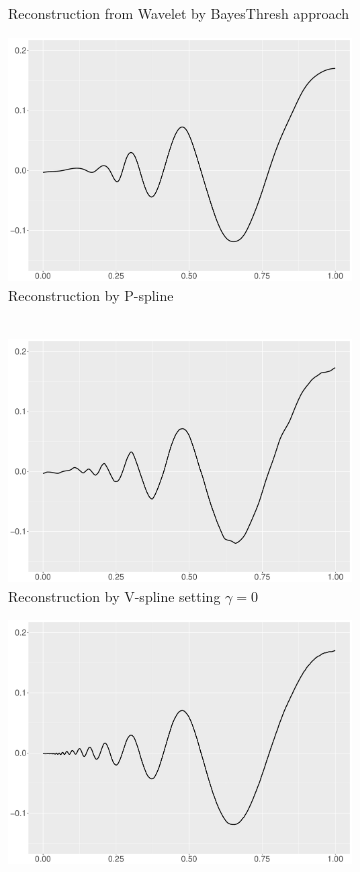 \begin{figure}
\begin{subfigure}{0.45\textwidth}
    \caption{Reconstruction from Wavelet by BayesThresh approach}
    \end{subfigure}
    \begin{subfigure}{0.45\textwidth}
    \centering
    \includegraphics[width=\linewidth,height=0.45\textwidth]{Chapters/02TractorSplineTheory/plot/ggplot/ggDopplerPSpline.pdf}
    \caption{Reconstruction by P-spline \\\mbox{  } }
    \end{subfigure}
    \begin{subfigure}{0.45\textwidth}
    \centering
    \includegraphics[width=\linewidth,height=0.45\textwidth]{Chapters/02TractorSplineTheory/plot/ggplot/ggDopplerGamma.pdf}
    \caption{Reconstruction by V-spline setting $\gamma=0$}
    \end{subfigure}
  \begin{subfigure}{0.45\textwidth}
    \centering
    \includegraphics[width=\linewidth,height=0.45\textwidth]{Chapters/02TractorSplineTheory/plot/ggplot/ggDopplerTractorAPT.pdf}

\end{subfigure}
\end{figure}
